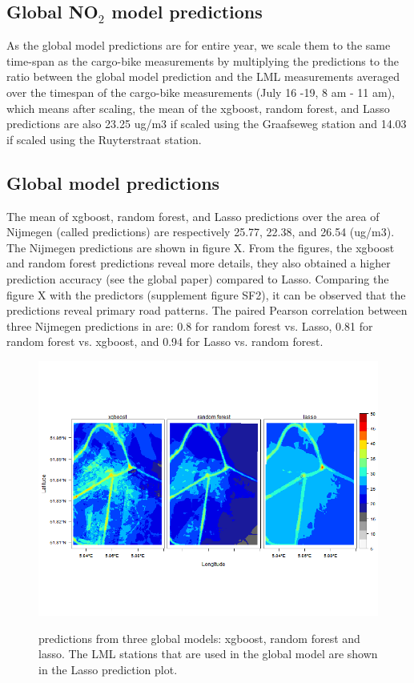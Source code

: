 \documentclass{article}
\begin{document}
  \subsection{Global NO$_2$ model predictions}
As the global model predictions are for entire year, we scale them to the same time-span as the cargo-bike measurements by multiplying the predictions to the ratio between the global model prediction and the LML measurements averaged over the timespan of the cargo-bike measurements (July 16 -19, 8 am - 11 am), which means after scaling, the mean of the xgboost, random forest, and Lasso predictions are also 23.25 ug/m3 if scaled using the Graafseweg station and 14.03 if scaled using the Ruyterstraat station.



\subsection{Global model predictions}
The mean of xgboost, random forest, and Lasso predictions over the area of Nijmegen (called predictions) are respectively 25.77, 22.38, and 26.54 (ug/m3). The Nijmegen predictions are shown in figure X. From the figures, the xgboost and random forest predictions reveal more details, they also obtained a higher prediction accuracy (see the global paper) compared to Lasso. Comparing the figure X with the predictors (supplement figure SF2), it can be observed that the predictions reveal primary road patterns. The paired Pearson correlation between three Nijmegen predictions in are: 0.8 for random forest vs. Lasso, 0.81 for random forest vs. xgboost, and 0.94 for Lasso vs. random forest.
\begin{figure}[h!]
    \includegraphics[width=\linewidth]{f3.png}
    \label{seperate}
    \caption {predictions from three global models: xgboost, random forest and lasso. The LML stations that are used in the global model are shown in the Lasso prediction plot.}
\end{figure}
\end{document}
